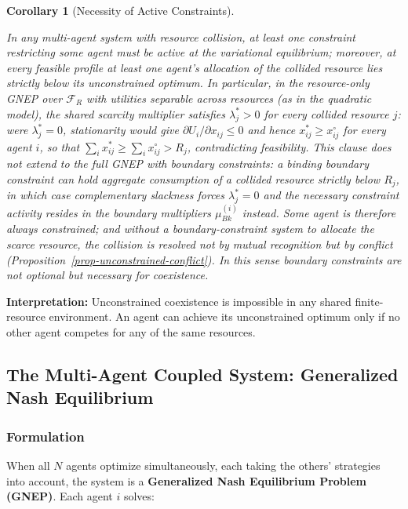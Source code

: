 \documentclass[11pt]{article}
\theoremstyle{plain}
\newtheorem{corollary}[theorem]{Corollary}
\theoremstyle{definition}
\theoremstyle{remark}
\let\origsubsection\subsection
\renewcommand{\subsection}{\needspace{7\baselineskip}\origsubsection}
\let\origsubsubsection\subsubsection
\renewcommand{\subsubsection}{\needspace{4\baselineskip}\origsubsubsection}
\begin{document}
\begin{corollary}[Necessity of Active Constraints]
\label{cor-necessity-active-constraints}

In any multi-agent system with resource collision, at least one constraint restricting some agent must be active at the variational equilibrium; moreover, at every feasible profile at least one agent's allocation of the collided resource lies strictly below its unconstrained optimum. In particular, in the resource-only GNEP over $\mathcal{F}_R$ with utilities separable across resources (as in the quadratic model), the shared scarcity multiplier satisfies $\lambda_j^* > 0$ for every collided resource $j$: were $\lambda_j^* = 0$, stationarity would give $\partial U_i / \partial x_{ij} \leq 0$ and hence $x_{ij}^* \geq x_{ij}^{\circ}$ for every agent $i$, so that $\sum_i x_{ij}^* \geq \sum_i x_{ij}^{\circ} > R_j$, contradicting feasibility. This clause does not extend to the full GNEP with boundary constraints: a binding boundary constraint can hold aggregate consumption of a collided resource strictly below $R_j$, in which case complementary slackness forces $\lambda_j^* = 0$ and the necessary constraint activity resides in the boundary multipliers $\mu_{Bk}^{(i)}$ instead. Some agent is therefore always constrained; and without a boundary-constraint system to allocate the scarce resource, the collision is resolved not by mutual recognition but by conflict (Proposition~\ref{prop-unconstrained-conflict}). In this sense boundary constraints are not optional but necessary for coexistence.
\end{corollary}

\textbf{Interpretation:} Unconstrained coexistence is impossible in any
shared finite-resource environment. An agent can achieve its
unconstrained optimum only if no other agent competes for any of the
same resources.

\subsection{The Multi-Agent Coupled System: Generalized Nash
Equilibrium}\label{the-multi-agent-coupled-system-generalized-nash-equilibrium}

\subsubsection{Formulation}\label{formulation-1}

When all \(N\) agents optimize simultaneously, each taking the others'
strategies into account, the system is a \textbf{Generalized Nash
Equilibrium Problem (GNEP)}. Each agent \(i\) solves:
\end{document}
